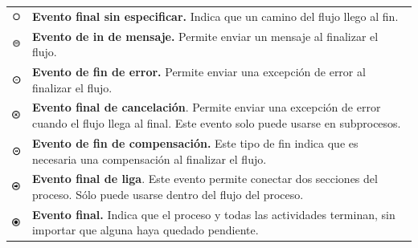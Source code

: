 \begin{itemize}
	\begin{tabular}{| m{} m{} | }%
		\rowcolor[gray]{0.97}%
		\centering\noindent\includegraphics[width=18pt]{introduccion/imagenes/procesos/bpmn/End.png} & {\bf Evento final sin especificar.} Indica que un camino del flujo llego al fin. \\
		\centering\noindent\includegraphics[width=18pt]{introduccion/imagenes/procesos/bpmn/MessageEndEvent.png} & {\bf Evento de in de mensaje.} Permite enviar un mensaje al finalizar el flujo.\\
		\rowcolor[gray]{0.97}%
		\centering\noindent\includegraphics[width=18pt]{introduccion/imagenes/procesos/bpmn/ErrorEndEvent.png} & {\bf Evento de fin de error.} Permite enviar una excepción de error al finalizar el flujo. \\
		\centering\noindent\includegraphics[width=18pt]{introduccion/imagenes/procesos/bpmn/CancelEndEvent.png} & {\bf Evento final de cancelación}. Permite enviar una excepción de error cuando el flujo llega al final. Este evento solo puede usarse en subprocesos. \\
		\rowcolor[gray]{0.97}%
		\centering\noindent\includegraphics[width=18pt]{introduccion/imagenes/procesos/bpmn/CompensationEndEvent.png} & {\bf Evento de fin de compensación.} Este tipo de fin indica que es necesaria una compensación al finalizar el flujo. \\
		\centering\noindent\includegraphics[width=18pt]{introduccion/imagenes/procesos/bpmn/LinkEvent.png} & {\bf Evento final de liga}. Este evento permite conectar dos secciones del proceso. Sólo puede usarse dentro del flujo del proceso.\\
		\rowcolor[gray]{0.97}%
		\centering\noindent\includegraphics[width=18pt]{introduccion/imagenes/procesos/bpmn/EndEvent.png} & {\bf Evento final.} Indica que el proceso y todas las actividades terminan, sin importar que alguna haya quedado pendiente. \\

\end{tabular}
\end{itemize}
